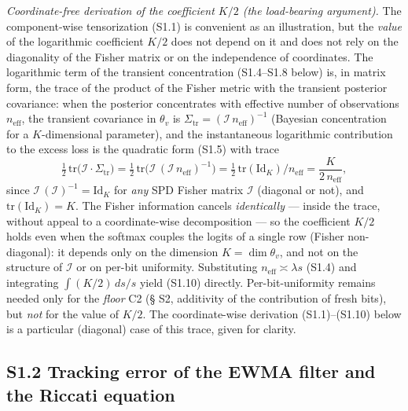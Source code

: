\documentclass[12pt]{iopart}
\begin{document}
\emph{Coordinate-free derivation of the coefficient \(K/2\) (the load-bearing argument).} The component-wise tensorization (S1.1) is convenient as an illustration, but the \emph{value} of the logarithmic coefficient \(K/2\) does not depend on it and does not rely on the diagonality of the Fisher matrix or on the independence of coordinates. The logarithmic term of the transient concentration (S1.4--S1.8 below) is, in matrix form, the trace of the product of the Fisher metric with the transient posterior covariance: when the posterior concentrates with effective number of observations \(n_{\text{eff}}\), the transient covariance in \(\theta_v\) is \(\Sigma_{\text{tr}} = (\mathcal I\,n_{\text{eff}})^{-1}\) (Bayesian concentration for a \(K\)-dimensional parameter), and the instantaneous logarithmic contribution to the excess loss is the quadratic form (S1.5) with trace \[\tfrac12\,\mathrm{tr}\!\big(\mathcal I\cdot\Sigma_{\text{tr}}\big) = \tfrac12\,\mathrm{tr}\!\big(\mathcal I\,(\mathcal I\,n_{\text{eff}})^{-1}\big) = \tfrac12\,\mathrm{tr}(\mathrm{Id}_K)/n_{\text{eff}} = \frac{K}{2\,n_{\text{eff}}},\] since \(\mathcal I\,(\mathcal I)^{-1} = \mathrm{Id}_K\) for \emph{any} SPD Fisher matrix \(\mathcal I\) (diagonal or not), and \(\mathrm{tr}(\mathrm{Id}_K) = K\). The Fisher information cancels \emph{identically} --- inside the trace, without appeal to a coordinate-wise decomposition --- so the coefficient \(K/2\) holds even when the softmax couples the logits of a single row (Fisher non-diagonal): it depends only on the dimension \(K = \dim\theta_v\), and not on the structure of \(\mathcal I\) or on per-bit uniformity. Substituting \(n_{\text{eff}} \asymp \lambda s\) (S1.4) and integrating \(\int (K/2)\,ds/s\) yield (S1.10) directly. Per-bit-uniformity remains needed only for the \emph{floor} C2 (§ S2, additivity of the contribution of fresh bits), but \emph{not} for the value of \(K/2\). The coordinate-wise derivation (S1.1)--(S1.10) below is a particular (diagonal) case of this trace, given for clarity.



\subsection{S1.2 Tracking error of the EWMA filter and the Riccati equation}\label{s1.2-tracking-error-of-the-ewma-filter-and-the-riccati-equation}
\end{document}
